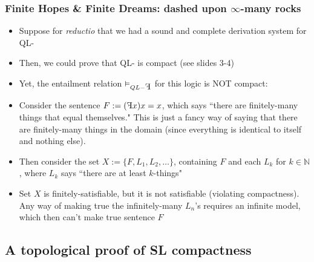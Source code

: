 \begin{frame}
\frametitle{Finite Hopes \& Finite Dreams: dashed upon $\infty$-many rocks}

\begin{itemize}[<+->]


\item Suppose for \textit{reductio} that we had a sound and complete derivation system for QL-

\item Then, we could prove that QL- is compact (see slides 3-4)

\item Yet, the entailment relation $\entails_{QL-\reflectbox{F}}$ for this logic is NOT compact:

\item Consider the sentence $F := \qt{\reflectbox{F}}{x}x=x$, which says ``there are finitely-many things that equal themselves." This is just a fancy way of saying that there are finitely-many things in the domain (since everything is identical to itself and nothing else).

\item Then consider the set $X := \{F, L_1, L_2, \dots \}$, containing $F$ and each $L_k$ for $k \in \mathbb{N}$, where $L_k$ says ``there are at least $k$-things"

\item Set $X$ is finitely-satisfiable, but it is not satisfiable (violating compactness). Any way of making true the infinitely-many $L_n$'s requires an infinite model, which then can't make true sentence $F$ 

\end{itemize}
\end{frame}

\subsection{A topological proof of SL compactness}


